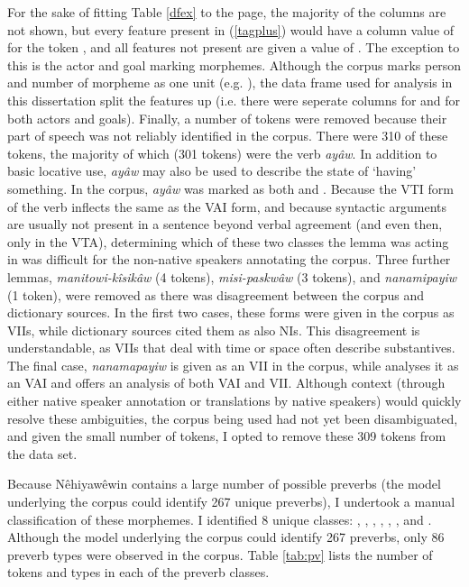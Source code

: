 For the sake of fitting Table \ref{dfex} to the page, the majority of the columns are not shown, but every feature present in (\ref{tagplus}) would have a column value of  for the token , and all features not present are given a value of . The exception to this is the actor and goal marking morphemes. Although the corpus marks person and number of morpheme as one unit (e.g. ), the data frame used for analysis in this dissertation split the features up (i.e. there were seperate columns for  and  for both actors and goals). Finally, a number of tokens were removed because their part of speech was not reliably identified in the corpus. There were 310 of these tokens, the majority of which (301 tokens) were the verb \textit{ayâw}. In addition to basic locative use, \textit{ayâw} may also be used to describe the state of `having' something. In the corpus, \textit{ayâw} was marked as both  and . Because the VTI form of the verb inflects the same as the VAI form, and because syntactic arguments are usually not present in a sentence beyond verbal agreement (and even then, only in the VTA), determining which of these two classes the lemma was acting in was difficult for the non-native speakers annotating the corpus. Three further lemmas, \textit{manitowi-kîsikâw} (4 tokens), \textit{misi-paskwâw} (3 tokens), and \textit{nanamipayiw} (1 token), were removed as there was disagreement between the corpus and dictionary sources. In the first two cases, these forms were given in the corpus as VIIs, while dictionary sources cited them as also NIs. This disagreement is understandable, as VIIs that deal with time or space often describe substantives. The final case, \textit{nanamapayiw} is given as an VII in the corpus, while \citet{Wolvengrey2001} analyses it as an VAI and \citet{leclaire1998alberta} offers an analysis of both VAI and VII. Although context (through either native speaker annotation or translations by native speakers) would quickly resolve these ambiguities, the corpus being used had not yet been disambiguated, and given the small number of tokens, I opted to remove these 309 tokens from the data set. 

Because Nêhiyawêwin contains a large number of possible preverbs (the model underlying the corpus could identify 267 unique preverbs), I undertook a manual classification of these morphemes. I identified 8 unique classes: , , , , , ,  and . Although the model underlying the corpus could identify 267 preverbs, only 86 preverb types were observed in the corpus. Table \ref{tab:pv} lists the number of tokens and types in each of the preverb classes.

